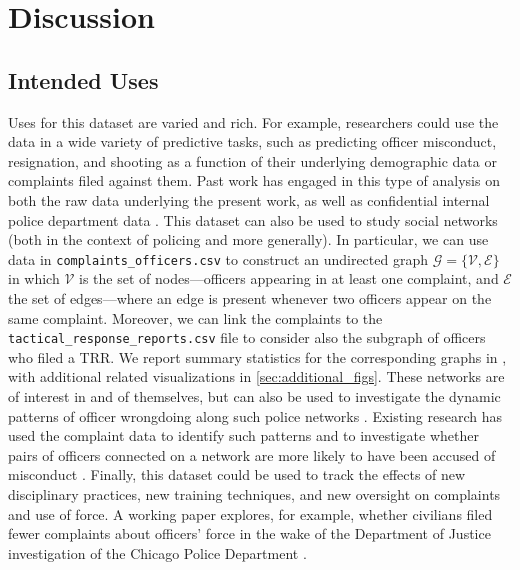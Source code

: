 \section{Discussion} \label{sec:discussion}

\subsection{Intended Uses}
Uses for this dataset are varied and rich. For example, researchers could
use the data in a wide variety of predictive tasks, such as
predicting officer misconduct, resignation, and shooting as a function
of their underlying demographic data or complaints filed against them. Past work has engaged
in this type of analysis on both the raw data underlying the present
work, as well as confidential internal police department data \cite{Helsby18,Rozema19}.
This dataset can also be used to study social networks (both in the context of policing and more generally). 
In particular, we can use data in \texttt{complaints\_officers.csv} to construct an
undirected graph $\mathcal{G} = \{\mathcal{V}, \mathcal{E}\}$ in which
$\mathcal{V}$ is the set of nodes---officers appearing in at least one
complaint, and $\mathcal{E}$ the set of edges---where an edge is present
whenever two officers appear on the same complaint. Moreover, we can link the
complaints to the \texttt{tactical\_response\_reports.csv} file to consider
also the subgraph of officers who filed a TRR. We report summary statistics
for the corresponding graphs in , with additional related visualizations
in \cref{sec:additional_figs}.
These networks are of interest in and of
themselves, but can also be used to investigate the dynamic patterns of officer
wrongdoing along such police networks \cite{Roithmayr16}. Existing research has used the complaint
data to identify such patterns and to investigate whether pairs of officers
connected on a network are more likely to have been accused of misconduct \cite{Ouellet19}.
Finally, this dataset could be used to track the effects of new disciplinary
practices, new training techniques, and new oversight on complaints and use of
force. A working paper explores, for example, whether civilians filed fewer
complaints about officers' force in the wake of the Department of Justice
investigation of the Chicago Police Department \cite{Travers20}. 


